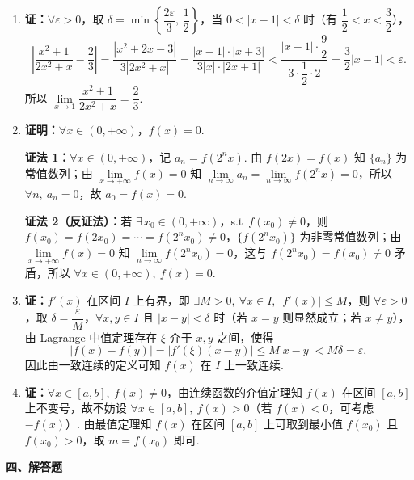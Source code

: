 \documentclass[a4paper,11pt]{ctexart}
\begin{document}
\begin{enumerate}[label=\arabic*., start=12, leftmargin=2em, itemsep=0.9em, topsep=0.4em]
  \item \textbf{证：}$\forall\varepsilon>0$，取 $\delta=\min\left\{\dfrac{2\varepsilon}{3},\,\dfrac{1}{2}\right\}$，当 $0<|x-1|<\delta$ 时（有 $\dfrac{1}{2}<x<\dfrac{3}{2}$），
  \[
    \left|\frac{x^2+1}{2x^2+x}-\frac{2}{3}\right|
    =\frac{|x^2+2x-3|}{3|2x^2+x|}
    =\frac{|x-1|\cdot|x+3|}{3|x|\cdot|2x+1|}
    <\frac{|x-1|\cdot\dfrac{9}{2}}{3\cdot\dfrac{1}{2}\cdot 2}
    =\frac{3}{2}|x-1|<\varepsilon.
  \]
  所以 $\lim\limits_{x\to 1}\dfrac{x^2+1}{2x^2+x}=\dfrac{2}{3}$.

  \item \textbf{证明：}$\forall x\in(0,+\infty)$，$f(x)=0$.

  \textbf{证法 1：}$\forall x\in(0,+\infty)$，记 $a_n=f(2^n x)$. 由 $f(2x)=f(x)$ 知 $\{a_n\}$ 为常值数列；由 $\lim\limits_{x\to+\infty}f(x)=0$ 知 $\lim\limits_{n\to\infty}a_n=\lim\limits_{n\to\infty}f(2^n x)=0$，所以 $\forall n,\ a_n=0$，故 $a_0=f(x)=0$.

  \textbf{证法 2（反证法）：}若 $\exists\,x_0\in(0,+\infty)$，s.t\ $f(x_0)\neq 0$，则 $f(x_0)=f(2x_0)=\cdots=f(2^n x_0)\neq 0$，$\{f(2^n x_0)\}$ 为非零常值数列；由 $\lim\limits_{x\to+\infty}f(x)=0$ 知 $\lim\limits_{n\to\infty}f(2^n x_0)=0$，这与 $f(2^n x_0)=f(x_0)\neq 0$ 矛盾，所以 $\forall x\in(0,+\infty),\ f(x)=0$.

  \item \textbf{证：}$f'(x)$ 在区间 $I$ 上有界，即 $\exists M>0,\ \forall x\in I,\ |f'(x)|\le M$，则 $\forall\varepsilon>0$，取 $\delta=\dfrac{\varepsilon}{M}$，$\forall x,y\in I$ 且 $|x-y|<\delta$ 时（若 $x=y$ 则显然成立；若 $x\neq y$），由 Lagrange 中值定理存在 $\xi$ 介于 $x,y$ 之间，使得
  \[
    |f(x)-f(y)|=|f'(\xi)(x-y)|\le M|x-y|<M\delta=\varepsilon,
  \]
  因此由一致连续的定义可知 $f(x)$ 在 $I$ 上一致连续.

  \item \textbf{证：}$\forall x\in[a,b],\ f(x)\neq 0$，由连续函数的介值定理知 $f(x)$ 在区间 $[a,b]$ 上不变号，故不妨设 $\forall x\in[a,b],\ f(x)>0$（若 $f(x)<0$，可考虑 $-f(x)$）. 由最值定理知 $f(x)$ 在区间 $[a,b]$ 上可取到最小值 $f(x_0)$ 且 $f(x_0)>0$，取 $m=f(x_0)$ 即可.
\end{enumerate}

\vspace{0.6em}
\textbf{四、解答题}
\end{document}
